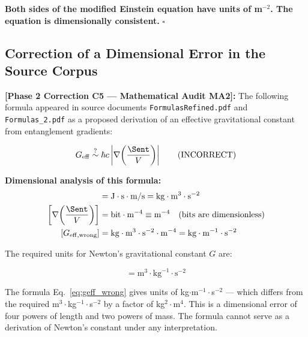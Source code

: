 \noindent\textbf{Both sides of the modified Einstein equation have units
of m$^{-2}$. The equation is dimensionally consistent.} $\square$

\subsection{Correction of a Dimensional Error in the Source Corpus}
\label{subsec:correction}

\begin{framed}
\noindent\textbf{[Phase 2 Correction C5 --- Mathematical Audit MA2]:}
The following formula appeared in source documents
\texttt{FormulasRefined.pdf} and \texttt{Formulas\_2.pdf} as a proposed
derivation of an effective gravitational constant from entanglement gradients:

\begin{equation}
    G_{\mathrm{eff}} \overset{?}{\sim} \hbar c
    \left|\nabla\!\left(\frac{\Sent}{V}\right)\right|
    \tag{INCORRECT}
    \label{eq:geff_wrong}
\end{equation}

\noindent\textbf{Dimensional analysis of this formula:}
\begin{align}
    [\hbar c] &= \mathrm{J}\cdot\mathrm{s}\cdot\mathrm{m/s}
    = \mathrm{kg}\cdot\mathrm{m}^3\cdot\mathrm{s}^{-2} \nonumber \\
    \left[\nabla\!\left(\frac{\Sent}{V}\right)\right]
    &= \mathrm{bit}\cdot\mathrm{m}^{-4}
    \equiv \mathrm{m}^{-4}\quad(\text{bits are dimensionless}) \nonumber \\
    [G_{\mathrm{eff,wrong}}] &= \mathrm{kg}\cdot\mathrm{m}^3\cdot
    \mathrm{s}^{-2}\cdot\mathrm{m}^{-4}
    = \mathrm{kg}\cdot\mathrm{m}^{-1}\cdot\mathrm{s}^{-2}
    \label{eq:geff_wrong_units}
\end{align}

\noindent The required units for Newton's gravitational constant $G$ are:

\begin{equation}
    [G] = \mathrm{m}^3\cdot\mathrm{kg}^{-1}\cdot\mathrm{s}^{-2}
    \label{eq:G_units}
\end{equation}

\noindent The formula Eq.~\eqref{eq:geff_wrong} gives units of
kg$\cdot$m$^{-1}\cdot$s$^{-2}$ --- which differs from the required
m$^3\cdot$kg$^{-1}\cdot$s$^{-2}$ by a factor of kg$^2\cdot$m$^4$.
This is a dimensional error of four powers of length and two powers of
mass. The formula cannot serve as a derivation of Newton's constant
under any interpretation.


\end{framed}
